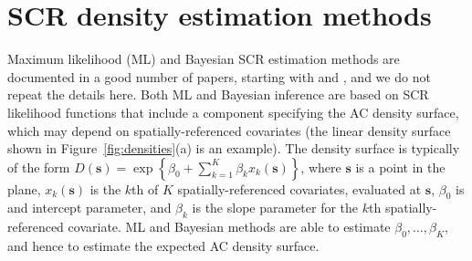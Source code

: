 \documentclass[10pt,a4paper]{article}
\begin{document}



\section{SCR density estimation methods}

Maximum likelihood (ML) and Bayesian SCR estimation methods are documented in a good number of papers, starting with \cite{Borchers+Efford:08} and \cite{Royle+Young:08}, and we do not repeat the details here. Both ML and Bayesian inference are based on SCR likelihood functions that include a component specifying the AC density surface, which may depend on spatially-referenced covariates (the linear density surface shown in Figure~\ref{fig:densities}(a) is an example). The density surface is typically of the form $D(\bm{s})=\exp\left\{\beta_0 + \sum_{k=1}^K\beta_kx_k(\bm{s})\right\}$, where $\bm{s}$ is a point in the plane, $x_k(\bm{s})$ is the $k$th of $K$ spatially-referenced covariates, evaluated at $\bm{s}$, $\beta_0$ is and intercept parameter, and $\beta_k$ is the slope parameter for the $k$th spatially-referenced covariate. ML and Bayesian methods are able to estimate $\beta_0,\ldots,\beta_K$, and hence to estimate the expected AC density surface. 
\end{document}
